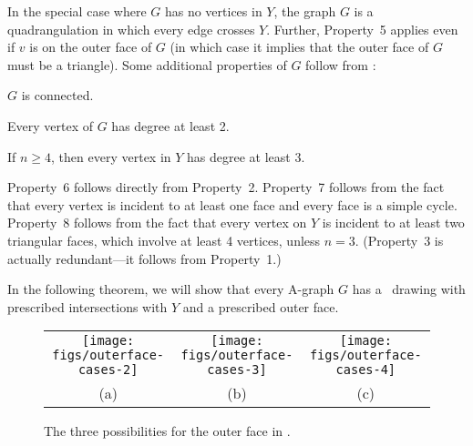 In the special case where $G$ has no vertices in $Y$, the graph $G$ is a quadrangulation in which every edge crosses $Y$. Further, Property~5 applies even if $v$ is on the outer face of $G$ (in which case it implies that the outer face of $G$ must be a triangle).
Some additional properties of $G$ follow from :
\begin{compactenum}\setcounter{enumi}{5}
	\item $G$ is connected.
	\item Every vertex of $G$ has degree at least 2.   
	\item If $n\ge 4$, then every vertex in $Y$ has degree at least 3. 
\end{compactenum}
Property~6 follows directly from Property~2.
Property~7 follows from the fact that every vertex is incident to at
least one face and every face is a simple cycle.
Property~8 follows from the fact that every vertex on $Y$ is incident
to at least two triangular faces, which involve at least 4 vertices,
unless $n=3$.
(Property~3 is actually redundant---it follows from Property~1.)

%
%

In the following theorem,
we will show that every A-graph $G$ has a \Fary\ drawing with prescribed intersections with $Y$ and a prescribed outer face.

\begin{figure}
   \begin{center}\begin{tabular}{ccc}
      \texttt{[image: figs/outerface-cases-2]} & 
      \texttt{[image: figs/outerface-cases-3]} & 
      \texttt{[image: figs/outerface-cases-4]} \\
      (a) & (b) & (c)
   \end{tabular}\end{center}
   \caption{The three possibilities for the outer face in
     .
   }
\end{figure} 

